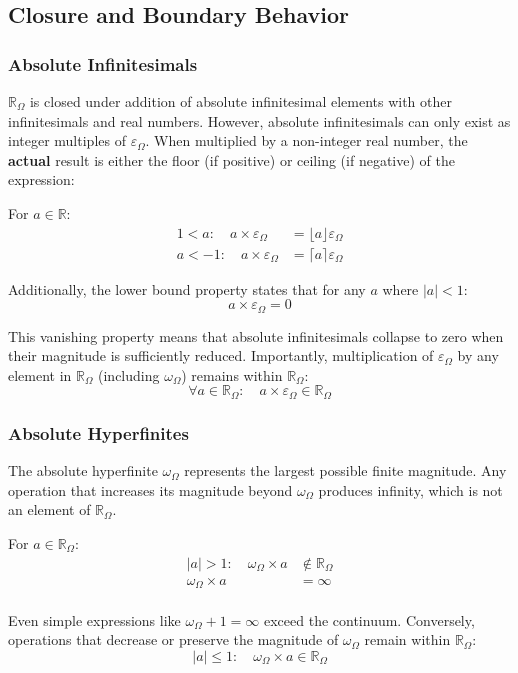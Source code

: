 \documentclass{article}
\begin{document}
\subsection{Closure and Boundary Behavior}

\subsubsection{Absolute Infinitesimals}

$\mathbb{R}_\Omega$ is closed under addition of absolute infinitesimal elements with other infinitesimals and real numbers. However, absolute infinitesimals can only exist as integer multiples of $\varepsilon_\Omega$. When multiplied by a non-integer real number, the \textbf{actual} result is either the floor (if positive) or ceiling (if negative) of the expression:

For $a \in \mathbb{R}$:
\begin{align*}
1 < a: \quad a \times \varepsilon_\Omega &= \lfloor a \rfloor \varepsilon_\Omega \\
a < -1: \quad a \times \varepsilon_\Omega &= \lceil a \rceil \varepsilon_\Omega
\end{align*}

Additionally, the lower bound property states that for any $a$ where $|a| < 1$:
$$a \times \varepsilon_\Omega = 0$$

This vanishing property means that absolute infinitesimals collapse to zero when their magnitude is sufficiently reduced. Importantly, multiplication of $\varepsilon_\Omega$ by any element in $\mathbb{R}_\Omega$ (including $\omega_\Omega$) remains within $\mathbb{R}_\Omega$:
$$\forall a \in \mathbb{R}_\Omega: \quad a \times \varepsilon_\Omega \in \mathbb{R}_\Omega$$

\subsubsection{Absolute Hyperfinites}

The absolute hyperfinite $\omega_\Omega$ represents the largest possible finite magnitude. Any operation that increases its magnitude beyond $\omega_\Omega$ produces infinity, which is not an element of $\mathbb{R}_\Omega$.

For $a \in \mathbb{R}_\Omega$:
\begin{align*}
|a| > 1: \quad \omega_\Omega \times a &\notin \mathbb{R}_\Omega \\
\omega_\Omega \times a &= \infty
\end{align*}\\Even simple expressions like $\omega_\Omega + 1 = \infty$ exceed the continuum. Conversely, operations that decrease or preserve the magnitude of $\omega_\Omega$ remain within $\mathbb{R}_\Omega$:
$$|a| \leq 1: \quad \omega_\Omega \times a \in \mathbb{R}_\Omega$$
\end{document}
